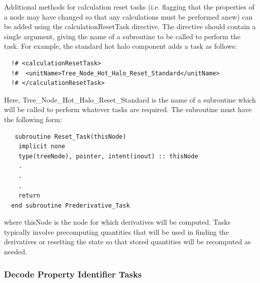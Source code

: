 Additional methods for calculation reset tasks (i.e. flagging that the properties of a node may have changed so that any calculations must be performed anew) can be added using the {\normalfont \ttfamily calculationResetTask} directive. The directive should contain a single argument, giving the name of a subroutine to be called to perform the task. For example, the standard hot halo component adds a task as follows:
\begin{verbatim}
  !# <calculationResetTask>
  !#  <unitName>Tree_Node_Hot_Halo_Reset_Standard</unitName>
  !# </calculationResetTask>
\end{verbatim}
Here, {\normalfont \ttfamily Tree\_Node\_Hot\_Halo\_Reset\_Standard} is the name of a subroutine which will be called to perform whatever tasks are required. The subroutine must have the following form:
\begin{verbatim}
   subroutine Reset_Task(thisNode)
    implicit none
    type(treeNode), pointer, intent(inout) :: thisNode
    .
    .
    .
    return
  end subroutine Prederivative_Task
\end{verbatim}
where {\normalfont \ttfamily thisNode} is the node for which derivatives will be computed. Tasks typically involve precomputing quantities that will be used in finding the derivatives or resetting the state so that stored quantities will be recomputed as needed.

\subsubsection{Decode Property Identifier Tasks}\label{sec:DecodePropertyIndentifierTask}

